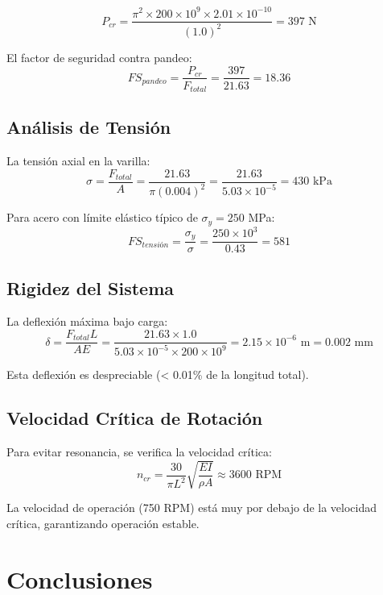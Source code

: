 \begin{equation}
P_{cr} = \frac{\pi^2 \times 200 \times 10^9 \times 2.01 \times 10^{-10}}{(1.0)^2} = 397 \text{ N}
\end{equation}

El factor de seguridad contra pandeo:
\begin{equation}
FS_{pandeo} = \frac{P_{cr}}{F_{total}} = \frac{397}{21.63} = 18.36
\end{equation}

\subsection{Análisis de Tensión}
La tensión axial en la varilla:
\begin{equation}
\sigma = \frac{F_{total}}{A} = \frac{21.63}{\pi (0.004)^2} = \frac{21.63}{5.03 \times 10^{-5}} = 430 \text{ kPa}
\end{equation}

Para acero con límite elástico típico de $\sigma_y = 250$ MPa:
\begin{equation}
FS_{tensión} = \frac{\sigma_y}{\sigma} = \frac{250 \times 10^3}{0.43} = 581
\end{equation}

\subsection{Rigidez del Sistema}
La deflexión máxima bajo carga:
\begin{equation}
\delta = \frac{F_{total} L}{A E} = \frac{21.63 \times 1.0}{5.03 \times 10^{-5} \times 200 \times 10^9} = 2.15 \times 10^{-6} \text{ m} = 0.002 \text{ mm}
\end{equation}

Esta deflexión es despreciable (< 0.01\% de la longitud total).

\subsection{Velocidad Crítica de Rotación}
Para evitar resonancia, se verifica la velocidad crítica:
\begin{equation}
n_{cr} = \frac{30}{\pi L^2} \sqrt{\frac{E I}{\rho A}} \approx 3600 \text{ RPM}
\end{equation}

La velocidad de operación (750 RPM) está muy por debajo de la velocidad crítica, garantizando operación estable.

\section{Conclusiones}

